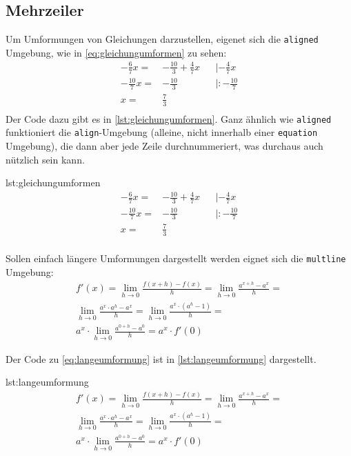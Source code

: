 \subsection{Mehrzeiler}
Um Umformungen von Gleichungen darzustellen, 
eigenet sich die {\tt aligned} Umgebung, wie in 
\autoref{eq:gleichungumformen} zu sehen:
\begin{equation} \label{eq:gleichungumformen}
	\begin{aligned}
		-\frac{6}{7}x = & -\frac{10}{3}+\frac{4}{7}x & & | -\frac{4}{7}x\\
		-\frac{10}{7}x  = & -\frac{10}{3} & & | : -\frac{10}{7}\\
		x  = & \frac{7}{3} \\
	\end{aligned}
\end{equation}
Der Code dazu gibt es in \autoref{lst:gleichungumformen}.
Ganz ähnlich wie {\tt aligned} funktioniert die {\tt align}-Umgebung 
(alleine, nicht innerhalb einer {\tt equation} Umgebung), 
die dann aber jede
Zeile durchnummeriert, was durchaus auch nützlich sein kann.
\begin{latexcode}{lst:gleichungumformen}
\begin{equation} \label{eq:gleichungumformen}
    \begin{aligned}
        -\frac{6}{7}x = & -\frac{10}{3}+\frac{4}{7}x & & | -\frac{4}{7}x\\
        -\frac{10}{7}x  = & -\frac{10}{3} & & | : -\frac{10}{7}\\
        x  = & \frac{7}{3} \\
    \end{aligned}
\end{equation}
\end{latexcode}


%
Sollen einfach längere Umformungen dargestellt werden
eignet sich die {\tt multline} Umgebung:
\begin{multline} \label{eq:langeumformung}
	f'(x) = \lim_{h \to 0} \frac{f(x+h)-f(x)}{h} = 
	\lim_{h \to 0} \frac{a^{x+h}-a^x}{h} =  \\
	\lim_{h \to 0} \frac{a^x \cdot a^h-a^x}{h} = 
	\lim_{h \to 0} \frac{a^x \cdot \left(a^h-1\right)}{h} =  \\
	a^x \cdot \lim_{h \to 0} \frac{a^{0+h}-a^0}{h} = a^x \cdot f'(0)	
\end{multline}

Der Code zu \autoref{eq:langeumformung} ist in \autoref{lst:langeumformung}
dargestellt.
\begin{latexcode}{lst:langeumformung}
\begin{multline} \label{eq:langeumformung}
    f'(x) = \lim_{h \to 0} \frac{f(x+h)-f(x)}{h} = 
    \lim_{h \to 0} \frac{a^{x+h}-a^x}{h} =  \\
    \lim_{h \to 0} \frac{a^x \cdot a^h-a^x}{h} = 
    \lim_{h \to 0} \frac{a^x \cdot \left(a^h-1\right)}{h} =  \\
    a^x \cdot \lim_{h \to 0} \frac{a^{0+h}-a^0}{h} = a^x \cdot f'(0)
\end{multline}
\end{latexcode}

